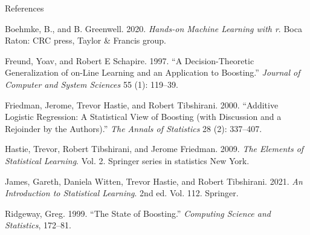 \documentclass[
  10pt,
  ignorenonframetext,
]{beamer}
\newlength{\cslhangindent}
\newlength{\cslentryspacingunit} %
\newenvironment{CSLReferences}[2] %
 {%
  \setlength{\parindent}{0pt}
  \ifodd #1
  \let\oldpar\par
  \def\par{\hangindent=\cslhangindent\oldpar}
  \fi
  \setlength{\parskip}{#2\cslentryspacingunit}
 }%
 {}
\begin{document}
\begin{frame}{References}
\protect\hypertarget{references}{}
\tiny

\hypertarget{refs}{}
\begin{CSLReferences}{1}{0}
\leavevmode{}%
Boehmke, B., and B. Greenwell. 2020. \emph{Hands-on Machine Learning
with r}. Boca Raton: CRC press, Taylor \& Francis group.

\leavevmode{}%
Freund, Yoav, and Robert E Schapire. 1997. {``A Decision-Theoretic
Generalization of on-Line Learning and an Application to Boosting.''}
\emph{Journal of Computer and System Sciences} 55 (1): 119--39.

\leavevmode{}%
Friedman, Jerome, Trevor Hastie, and Robert Tibshirani. 2000.
{``Additive Logistic Regression: A Statistical View of Boosting (with
Discussion and a Rejoinder by the Authors).''} \emph{The Annals of
Statistics} 28 (2): 337--407.

\leavevmode{}%
Hastie, Trevor, Robert Tibshirani, and Jerome Friedman. 2009. \emph{The
Elements of Statistical Learning}. Vol. 2. Springer series in statistics
New York.

\leavevmode{}%
James, Gareth, Daniela Witten, Trevor Hastie, and Robert Tibshirani.
2021. \emph{An Introduction to Statistical Learning}. 2nd ed. Vol. 112.
Springer.

\leavevmode{}%
Ridgeway, Greg. 1999. {``The State of Boosting.''} \emph{Computing
Science and Statistics}, 172--81.

\end{CSLReferences}
\end{frame}
\end{document}
